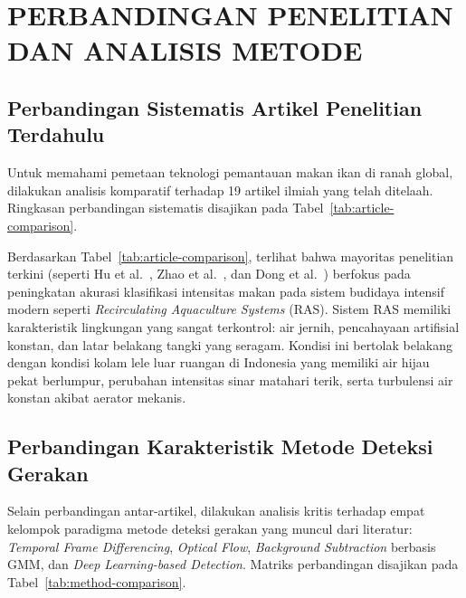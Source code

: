 \section{PERBANDINGAN PENELITIAN DAN ANALISIS METODE}
\label{sec:perbandingan}

\subsection{Perbandingan Sistematis Artikel Penelitian Terdahulu}
Untuk memahami pemetaan teknologi pemantauan makan ikan di ranah global, dilakukan analisis komparatif terhadap 19 artikel ilmiah yang telah ditelaah. Ringkasan perbandingan sistematis disajikan pada Tabel~\ref{tab:article-comparison}.



Berdasarkan Tabel~\ref{tab:article-comparison}, terlihat bahwa mayoritas penelitian terkini (seperti Hu et al.~\cite{Hu2026}, Zhao et al.~\cite{Zhao2025}, dan Dong et al.~\cite{Dong2024}) berfokus pada peningkatan akurasi klasifikasi intensitas makan pada sistem budidaya intensif modern seperti \textit{Recirculating Aquaculture Systems} (RAS). Sistem RAS memiliki karakteristik lingkungan yang sangat terkontrol: air jernih, pencahayaan artifisial konstan, dan latar belakang tangki yang seragam. Kondisi ini bertolak belakang dengan kondisi kolam lele luar ruangan di Indonesia yang memiliki air hijau pekat berlumpur, perubahan intensitas sinar matahari terik, serta turbulensi air konstan akibat aerator mekanis.

\subsection{Perbandingan Karakteristik Metode Deteksi Gerakan}
Selain perbandingan antar-artikel, dilakukan analisis kritis terhadap empat kelompok paradigma metode deteksi gerakan yang muncul dari literatur: \textit{Temporal Frame Differencing}, \textit{Optical Flow}, \textit{Background Subtraction} berbasis GMM, dan \textit{Deep Learning-based Detection}. Matriks perbandingan disajikan pada Tabel~\ref{tab:method-comparison}.



